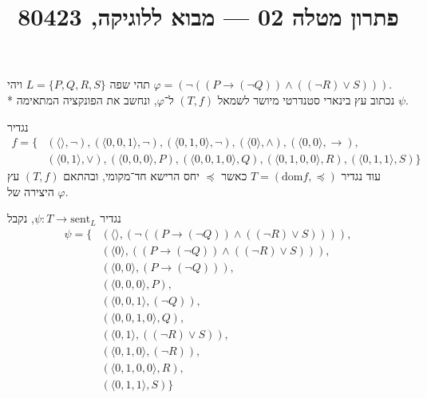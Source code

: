 
\title{פתרון מטלה 02 --- מבוא ללוגיקה, 80423}


\maketitle
\maketitleprint{}

\Question{}
תהי שפה $L = \{P, Q, R, S\}$ ויהי $\varphi = (\lnot ((P \to (\lnot Q)) \land ((\lnot R) \lor S)))$. \\*
נכתוב עץ בינארי סטנדרטי מיושר לשמאל $(T, f)$ ל־$\varphi$, ונחשב את הפונקציה המתאימה $\psi$.
\begin{solution}
	נגדיר
	\begin{align*}
		f = \{
			& (\langle \rangle, \lnot),
			(\langle 0, 0, 1 \rangle, \lnot),
			(\langle 0, 1, 0 \rangle, \lnot),
			(\langle 0 \rangle, \land),
			(\langle 0, 0 \rangle, \rightarrow), \\
			& (\langle 0, 1 \rangle, \lor),
			(\langle 0, 0, 0 \rangle, P),
			(\langle 0, 0, 1, 0 \rangle, Q),
			(\langle 0, 1, 0, 0 \rangle, R),
			(\langle 0, 1, 1 \rangle, S)
		\}
	\end{align*}
	עוד נגדיר $T = (\text{dom} f, \preceq)$ כאשר $\preceq$ יחס הרישא חד־מקומי, ובהתאם $(T, f)$ עץ היצירה של $\varphi$.

	נגדיר $\psi : T \to \text{sent}_L$, נקבל
	\begin{align*}
		\psi = \{
			& ( \langle \rangle, (\lnot ((P \to (\lnot Q)) \land ((\lnot R) \lor S))) ), \\
			& ( \langle 0 \rangle, ((P \to (\lnot Q)) \land ((\lnot R) \lor S)) ), \\
			& ( \langle 0, 0 \rangle, (P \to (\lnot Q)) ), \\
			& ( \langle 0, 0, 0 \rangle, P ), \\
			& ( \langle 0, 0, 1 \rangle, (\lnot Q) ), \\
			& ( \langle 0, 0, 1, 0 \rangle, Q ), \\
			& ( \langle 0, 1 \rangle, ((\lnot R) \lor S) ), \\
			& ( \langle 0, 1, 0 \rangle, (\lnot R) ), \\
			& ( \langle 0, 1, 0, 0 \rangle, R ), \\
			& ( \langle 0, 1, 1 \rangle, S )
		\}
	\end{align*}
\end{solution}

